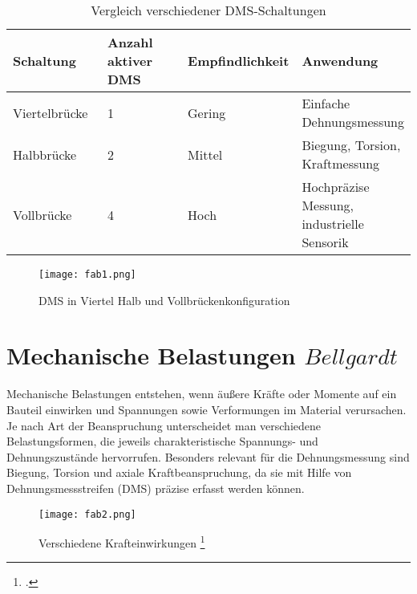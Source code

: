 \bgroup
\def\arraystretch{2}
\begin{table}[h]
\centering
\begin{tabular}{|p{0.25\linewidth}|p{0.25\linewidth}|p{0.25\linewidth}|p{0.25\linewidth}|}
\hline
Schaltung & Anzahl aktiver DMS & Empfindlichkeit & Anwendung \\ \hline
Viertelbrücke & 1 & Gering & Einfache Dehnungsmessung \\ \hline
Halbbrücke & 2 & Mittel & Biegung, Torsion, Kraftmessung \\ \hline
Vollbrücke & 4 & Hoch & Hochpräzise Messung, industrielle Sensorik \\ \hline
\end{tabular}
\caption{Vergleich verschiedener DMS-Schaltungen}
\label{tbl:dms_schaltungen}
\end{table}
\egroup


\begin{figure}[h]
    \begin{center}
        \texttt{[image: fab1.png]}
        \caption[DMS in Viertel\- Halb\- und Vollbr\"uckenkonfiguration (Abbildungsverzeichnis)]{DMS in Viertel\- Halb\- und Vollbr\"uckenkonfiguration
        \cite{LearnChannel}
        }
        \label{fig:fab1}
    \end{center}
\end{figure}






\section{Mechanische Belastungen \(Bellgardt\)}
Mechanische Belastungen entstehen, wenn äußere Kräfte oder Momente auf ein Bauteil einwirken und Spannungen sowie Verformungen im Material verursachen. Je nach Art der Beanspruchung unterscheidet man verschiedene Belastungsformen, die jeweils charakteristische Spannungs- und Dehnungszustände hervorrufen. Besonders relevant für die Dehnungsmessung sind Biegung, Torsion und axiale Kraftbeanspruchung, da sie mit Hilfe von Dehnungsmessstreifen (DMS) präzise erfasst werden können.

\begin{figure}[h]
    \begin{center}
        \texttt{[image: fab2.png]}
        \caption[Verschiedene Krafteinwirkungen (Abbildungsverzeichnis)]{Verschiedene Krafteinwirkungen
        \footcite{https://www.maschinenbau-wissen.de/bilder/skripte/mechanik/belastungsarten-03.PNG}
        }
        \label{fig:fab2}
    \end{center}
\end{figure}
